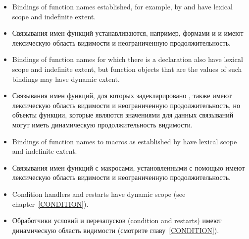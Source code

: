 \begin{newer}
\begin{itemize}
\item Bindings of function names established, for example, by  and
 have lexical scope and indefinite extent.

\item Связывания имен функций устанавливаются, например, формами  и
   и имеют лексическую область видимости и неограниченную продолжительность.

\item Bindings of function names for which there is a 
declaration also have lexical scope and indefinite extent,
but function objects that are the values of such bindings may have
dynamic extent.

\item Связывания имен функций, для которых задекларировано ,
  также имеют лексическую область видимости и неограниченную продолжительность,
  но объекты функции, которые являются значениями для данных связываний могут
  иметь динамическую продолжительность видимости.

\item Bindings of function names to macros as established by
 have lexical scope and indefinite extent.

\item Связывания имен функций с макросами, установленными с помощью
   имеют лексическую область видимости и неограниченную
  продолжительность.

\item Condition handlers and restarts have dynamic scope
(see chapter~\ref{CONDITION}).

\item Обработчики условий и перезапусков (condition and restarts) имеют
  динамическую область видимости (смотрите главу~\ref{CONDITION}).
\end{itemize}
\end{newer}

